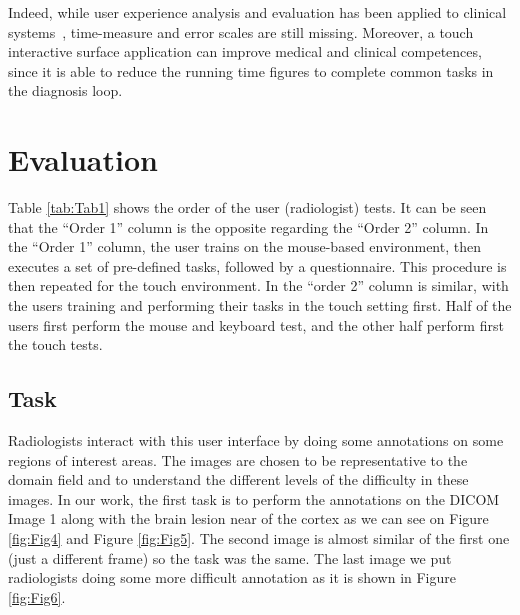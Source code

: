 \documentclass{chi-ext}
\begin{document}
Indeed, while user experience analysis and evaluation has been applied to clinical systems~\cite{crisan2013optimization},  time-measure and error scales are still missing. Moreover, a touch interactive surface application can improve medical and clinical competences, since it is able to reduce the running time figures to complete common tasks in the diagnosis loop.

\section{Evaluation}

Table \ref{tab:Tab1} shows the order of the user (radiologist) tests. It can be seen that the ``Order 1'' column is the opposite regarding the ``Order 2'' column. In the ``Order 1'' column, the user trains on the mouse-based environment, then executes a set of pre-defined tasks, followed by a questionnaire. This procedure is then repeated for the touch environment. In the ``order 2'' column is similar, with the users training and performing their tasks in the touch setting first. Half of the users first perform the mouse and keyboard test, and the other half perform first the touch tests.

\subsection{Task}

Radiologists interact with this user interface by doing some annotations on some regions of interest areas. The images are chosen to be representative to the domain field and to understand the different levels of the difficulty in these images. In our work, the first task is to perform the annotations on the DICOM Image 1 along with the brain lesion near of the cortex as we can see on Figure \ref{fig:Fig4} and Figure \ref{fig:Fig5}. The second image is almost similar of the first one (just a different frame) so the task was the same. The last image we put radiologists doing some more difficult annotation as it is shown in Figure \ref{fig:Fig6}.
\end{document}
